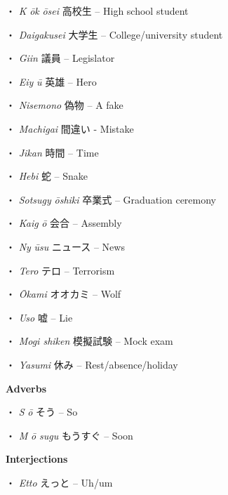 \par{・ \emph{K }\emph{ōk }\emph{ōsei }高校生 – High school student }
 
\par{・ \emph{Daigakusei }大学生 – College\slash university student }
 
\par{・ \emph{Giin }議員 – Legislator }
 
\par{・ \emph{Eiy }\emph{ū }英雄 – Hero }
 
\par{・ \emph{Nisemono }偽物 – A fake }
 
\par{・ \emph{Machigai }間違い - Mistake }
 
\par{・ \emph{Jikan }時間 – Time }
 
\par{・ \emph{Hebi }蛇 – Snake }
 
\par{・ \emph{Sotsugy }\emph{ōshiki }卒業式 – Graduation ceremony }
 
\par{・ \emph{Kaig }\emph{ō }会合 – Assembly }
 
\par{・ \emph{Ny }\emph{ūsu }ニュース – News }
 
\par{・ \emph{Tero }テロ – Terrorism }
 
\par{・ \emph{Ōkami }オオカミ – Wolf }
 
\par{・ \emph{Uso }嘘 – Lie }
 
\par{・ \emph{Mogi shiken }模擬試験 – Mock exam }
 
\par{・ \emph{Yasumi }休み – Rest\slash absence\slash holiday }

\par{\textbf{Adverbs }}

\par{・ \emph{S }\emph{ō }そう – So }

\par{・ \emph{M }\emph{ō sugu }もうすぐ – Soon }

\par{\textbf{Interjections }}

\par{・ \emph{Etto }えっと – Uh\slash um }

